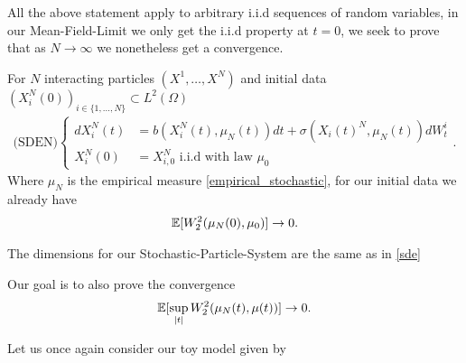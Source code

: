 All the above statement apply to arbitrary i.i.d sequences of random variables, in our Mean-Field-Limit we only get 
the i.i.d property at $t=0$, we seek to prove that as $N \to \infty$ we nonetheless get a convergence.\\[1ex]
\begin{definition}\label{sden}
  For $N$ interacting particles $(X^{1} ,\ldots ,X^{N} )$ and initial data $(X_i^{N}(0))_{i \in  \{1,\ldots ,N\}  } \subset  L^2(\Omega) $
\begin{align*}
  \text{(SDEN)}\begin{cases}
    d X_i^{N}(t) &=   b(X_i^{N}(t) , \mu_N(t) )dt + \sigma(X_i(t)^{N},\mu_N(t))dW^{i}_t \\
    X_i^{N}(0) &= X_{i,0}^{N}   \text{ i.i.d with law } \mu_0
  \end{cases}
.\end{align*}
Where $\mu_N$ is the empirical measure \autoref{empirical_stochastic}, for our initial data we already have
\begin{align*}
  \mathbb{E}[W_2^{2}(\mu_N(0),\mu_0) ] \to  0
.\end{align*}
\end{definition}
\begin{remark}
  The dimensions for our Stochastic-Particle-System are the same as in \autoref{sde}
\end{remark}
\begin{remark}
 Our goal is to also prove the convergence 
 \begin{align*}
   \mathbb{E}[\sup_{\lvert t\rvert} W_2^{2}(\mu_N(t),\mu(t))  ] \to 0
 .\end{align*}
\end{remark}
Let us once again consider our toy model given by 
